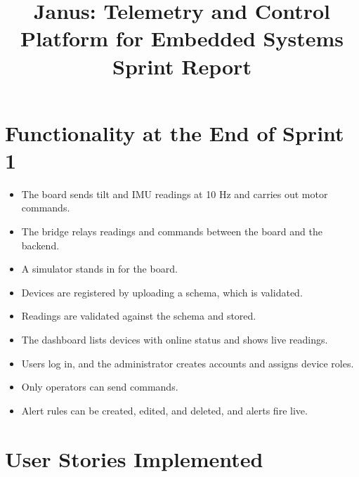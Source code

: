 \documentclass[11pt]{article}
\title{\vspace{-1.5cm}Janus: Telemetry and Control Platform for Embedded Systems\\\large Sprint Report}
\author{}
\date{}
\begin{document}
\maketitle
\vspace{-1cm}

\section{Functionality at the End of Sprint 1}

\begin{itemize}[leftmargin=1.5em]
\item The board sends tilt and IMU readings at 10 Hz and carries out motor commands.
\item The bridge relays readings and commands between the board and the backend.
\item A simulator stands in for the board.
\item Devices are registered by uploading a schema, which is validated.
\item Readings are validated against the schema and stored.
\item The dashboard lists devices with online status and shows live readings.
\item Users log in, and the administrator creates accounts and assigns device roles.
\item Only operators can send commands.
\item Alert rules can be created, edited, and deleted, and alerts fire live.
\end{itemize}

\section{User Stories Implemented}
\end{document}
